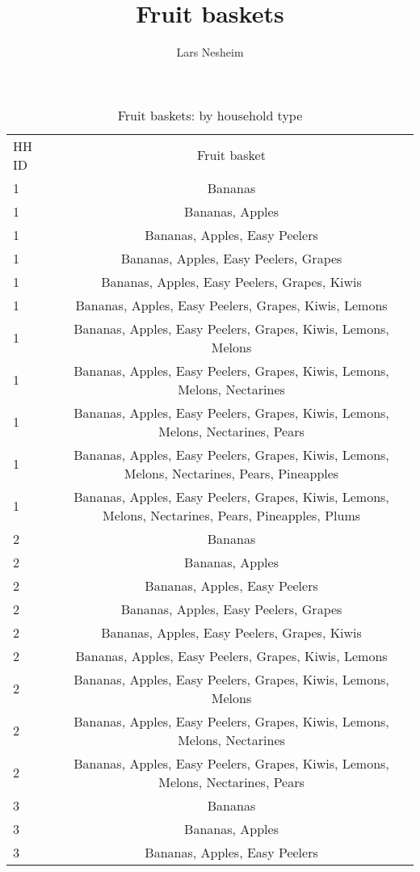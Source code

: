 \documentclass[11pt]{article}
\title{Fruit baskets}
\author{Lars Nesheim}
\date{}
\begin{document}
\maketitle
\begin{table}[h]
\caption{Fruit baskets: by household type}
\label{table:fruit baskets}
\begin{center}
\begin{tabular}{lc}
\hline \hline
HH ID & Fruit basket \\
1 & Bananas \\
1 & Bananas, Apples \\
1 & Bananas, Apples, Easy Peelers \\
1 & Bananas, Apples, Easy Peelers, Grapes \\
1 & Bananas, Apples, Easy Peelers, Grapes, Kiwis \\
1 & Bananas, Apples, Easy Peelers, Grapes, Kiwis, Lemons \\
1 & Bananas, Apples, Easy Peelers, Grapes, Kiwis, Lemons, Melons \\
1 & Bananas, Apples, Easy Peelers, Grapes, Kiwis, Lemons, Melons, Nectarines \\
1 & Bananas, Apples, Easy Peelers, Grapes, Kiwis, Lemons, Melons, Nectarines, Pears \\
1 & Bananas, Apples, Easy Peelers, Grapes, Kiwis, Lemons, Melons, Nectarines, Pears, Pineapples \\
1 & Bananas, Apples, Easy Peelers, Grapes, Kiwis, Lemons, Melons, Nectarines, Pears, Pineapples, Plums \\
2 & Bananas \\
2 & Bananas, Apples \\
2 & Bananas, Apples, Easy Peelers \\
2 & Bananas, Apples, Easy Peelers, Grapes \\
2 & Bananas, Apples, Easy Peelers, Grapes, Kiwis \\
2 & Bananas, Apples, Easy Peelers, Grapes, Kiwis, Lemons \\
2 & Bananas, Apples, Easy Peelers, Grapes, Kiwis, Lemons, Melons \\
2 & Bananas, Apples, Easy Peelers, Grapes, Kiwis, Lemons, Melons, Nectarines \\
2 & Bananas, Apples, Easy Peelers, Grapes, Kiwis, Lemons, Melons, Nectarines, Pears \\
3 & Bananas \\
3 & Bananas, Apples \\
3 & Bananas, Apples, Easy Peelers \\

\end{tabular}
\end{center}
\end{table}
\end{document}
